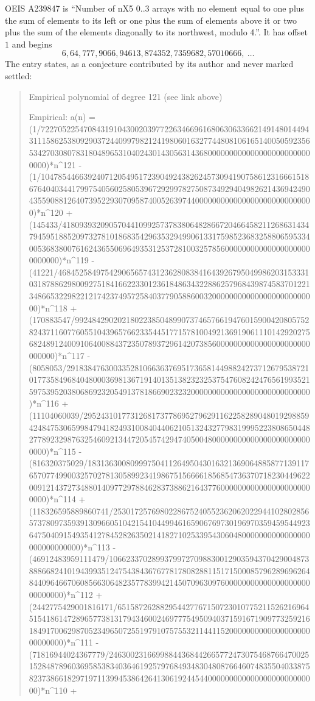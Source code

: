 \documentclass[11pt,a4paper]{article}
\theoremstyle{plain}
\theoremstyle{definition}
\begin{document}
OEIS A239847 is ``Number of nX5 0..3 arrays with no element equal to one plus the sum of elements to its left or one plus the sum of elements above it or two plus the sum of the elements diagonally to its northwest, modulo 4.''. It has offset $1$ and begins
\[
6, 64, 777, 9066, 94613, 874352, 7359682, 57010666,\ \dots
\]
The entry states, as a conjecture contributed by its author and never marked settled:
\begin{quote}
Empirical polynomial of degree 121 (see link above)

Empirical: a(n) = (1/7227052254708431910430020397722634669616806306336621491480144943111586253809290372440997982124198060163277448081061651400505923565342703080783180489653104024301430563143680000000000000000000000000000)*n\^{}121 - (1/1047854466392407120549517239049243826245730941907586123166615186764040344179975405602580539672929978275087349294049826214369424904355908812640739522930709587400526397440000000000000000000000000000)*n\^{}120 + (145433/41809393209057044109925737838064828667204664582112686314347945951885209732781018683542963532949906133175985236832588065953340053683800761624365506964935312537281003257856000000000000000000000000000)*n\^{}119 - (41221/4684525849754290656574312362808384164392679504998620315333103187886298009275184166223301236184863432288625796843987458370122134866532298221217423749572584037790588600320000000000000000000000000)*n\^{}118 + (170883547/9924842902021802238504899073746576619476015900420805752824371160776055104396576623354451771578100492136919061110142920275682489124009106400884372350789372961420738560000000000000000000000000000)*n\^{}117 - (8058053/291838476300335281066363769517365814498824273712679538721017735849684048000369813671914013513823232537547608242476561993521597539520380686923205491378186690232320000000000000000000000000000)*n\^{}116 + (11104060039/295243101773126817377869527962911622582890480192988594248475306599847941824931008404406210513243277983199952238086504482778923298763254609213447205457429474050048000000000000000000000000000)*n\^{}115 - (816320375029/18313630080999750411264950430163213690648858771391176570774990032570278130589923419867515666618568547363707182304496220091214372734880140977297884628373886216437760000000000000000000000000)*n\^{}114 + (118326595889860741/2530172576980228675240552362062022944102802856573780973593913096605104215410449946165906769730196970359459544923647504091549354127845282635021418271025339543060480000000000000000000000000000)*n\^{}113 - (46912483959111479/1066233702899379972709883001290359437042900487388866824101943993512475438436767781780828811517150008579628969626484409646670608566306482357783994214507096309760000000000000000000000000000)*n\^{}112 + (2442775429001816171/65158726288295442776715072301077521152621696451541861472896577381317943460024697775495094037159167190977325921618491700629870523496507255197910757553211441152000000000000000000000000000)*n\^{}111 - (71816944024367779/2463002316699884436844266577247307546876647002515284878960369585383403646192579768493483048087664607483550403387582373866182971971139945386426413061924454400000000000000000000000000)*n\^{}110 + 
\end{quote}
\end{document}
